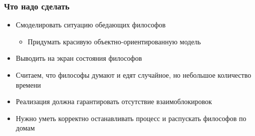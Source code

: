\documentclass[xetex,mathserif,serif]{beamer}
\begin{document}
    \begin{frame}
        \frametitle{Что надо сделать}
        \begin{itemize}
            \item Смоделировать ситуацию обедающих философов
            \begin{itemize}
                \item Придумать красивую объектно-ориентированную модель
            \end{itemize}
            \item Выводить на экран состояния философов
            \item Считаем, что философы думают и едят случайное, но небольшое количество времени
            \item Реализация должна гарантировать отсутствие взаимоблокировок
            \item Нужно уметь корректно останавливать процесс и распускать философов по домам
        \end{itemize}
    \end{frame}
\end{document}
